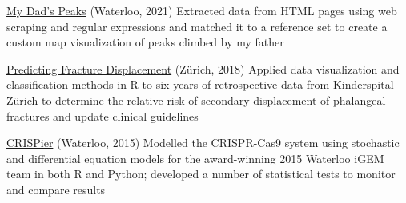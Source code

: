 \documentclass[a4paper,11pt]{article}
\newenvironment{compactDesc}
{ \begin{description}
		\setlength{\itemsep}{2pt}
		\setlength{\parskip}{2pt}
		\setlength{\parsep}{1pt}     }
	{ \end{description}                  }
\begin{document}
\begin{compactDesc}\item[\href{https://medium.com/@cdsalahub/mapping-my-dads-peaks-b36b756443f2}{My Dad's Peaks}] (Waterloo, 2021) {\footnotesize Extracted data from HTML pages using web scraping and regular expressions and matched it to a reference set to create a custom map visualization of peaks climbed by my father}
	\item[\href{https://www.zora.uzh.ch/id/eprint/161560/1/Nonarticular_Base_and_Shaft_Fractures_of.98596.pdf}{Predicting Fracture Displacement}] (Z\"urich, 2018) {\footnotesize Applied data visualization and classification methods in R to six years of retrospective data from Kinderspital Z\"urich to determine the relative risk of secondary displacement of phalangeal fractures and update clinical guidelines}
	\item[\href{http://2015.igem.org/Team:Waterloo}{CRISPier}] (Waterloo, 2015) {\footnotesize Modelled the CRISPR-Cas9 system using stochastic and differential equation models for the award-winning 2015 Waterloo iGEM team in both R and Python; developed a number of statistical tests to monitor and compare results}
\end{compactDesc}

\vspace{0.3cm}

 \hrulefill
\end{document}
